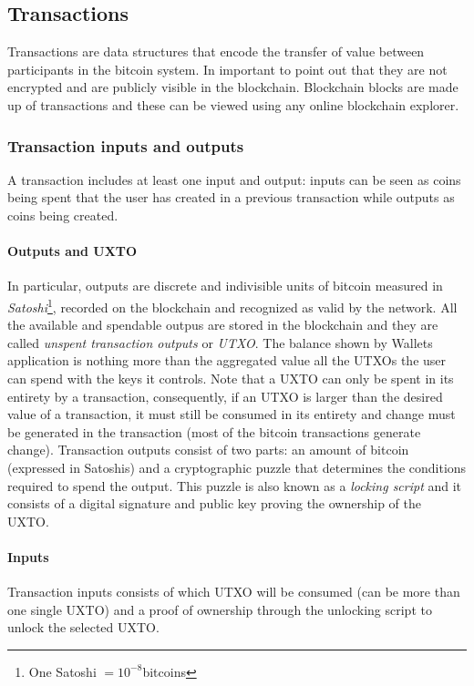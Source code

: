 \subsection{Transactions}\label{sec:transactions} Transactions are data structures that encode the
transfer of value between participants in the bitcoin system. In important to
point out that they are not encrypted and are publicly visible in the
blockchain. Blockchain blocks are made up of transactions and these can be
viewed using any online blockchain explorer.

\subsubsection{Transaction inputs and outputs}
A transaction includes at least one input and output: inputs can be seen as
coins being spent that the user has created in a previous transaction while
outputs as coins being created.

\paragraph{Outputs and UXTO} In particular, outputs are discrete and indivisible
units of bitcoin measured in \emph{Satoshi}\footnote{One Satoshi
$=10^{-8}$bitcoins}, recorded on the blockchain and recognized as valid by the
network. All the available and spendable outpus are stored in the blockchain and
they are called \emph{unspent transaction outputs} or \emph{UTXO}. The balance
shown by Wallets application is nothing more than the aggregated value all the
UTXOs the user can spend with the keys it controls. Note that a UXTO can only be
spent in its entirety by a transaction, consequently, if an UTXO is larger than
the desired value of a transaction, it must still be consumed in its entirety
and change must be generated in the transaction (most of the bitcoin
transactions generate change). Transaction outputs consist of two parts: an
amount of bitcoin (expressed in Satoshis) and a cryptographic puzzle that
determines the conditions required to spend the output. This puzzle is also
known as a \emph{locking script} and it consists of a digital signature and
public key proving the ownership of the UXTO.

\paragraph{Inputs} Transaction inputs consists of which UTXO will be consumed
(can be more than one single UXTO) and a proof of ownership through the
unlocking script to unlock the selected UXTO.


